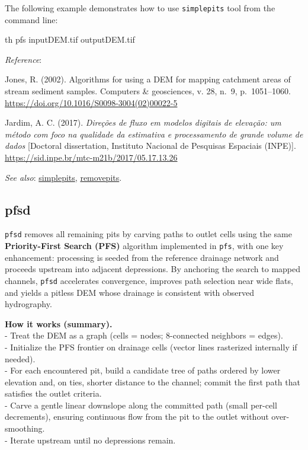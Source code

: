 \documentclass[
]{book}
\newenvironment{Shaded}{\begin{snugshade}}{\end{snugshade}}
\newcommand{\ExtensionTok}[1]{#1}
\newcommand{\NormalTok}[1]{#1}
\theoremstyle{definition}
\theoremstyle{definition}
\theoremstyle{definition}
\theoremstyle{definition}
\theoremstyle{remark}
\begin{document}
The following example demonstrates how to use \texttt{simplepits} tool from the command line:

\begin{Shaded}
\begin{Highlighting}[]
\ExtensionTok{th}\NormalTok{ pfs inputDEM.tif outputDEM.tif}
\end{Highlighting}
\end{Shaded}

\emph{Reference}:

Jones, R. (2002). Algorithms for using a DEM for mapping catchment areas of stream sediment samples. Computers \& geosciences, v. 28, n.~9, p.~1051--1060. \url{https://doi.org/10.1016/S0098-3004(02)00022-5}

Jardim, A. C. (2017). \emph{Direções de fluxo em modelos digitais de elevação: um método com foco na qualidade da estimativa e processamento de grande volume de dados} {[}Doctoral dissertation, Instituto Nacional de Pesquisas Espaciais (INPE){]}. \href{http://mtc-m21b.sid.inpe.br/col/sid.inpe.br/mtc-m21b/2017/05.17.13.26/doc/publicacao.pdf?metadatarepository=sid.inpe.br/mtc-m21b/2017/05.17.13.26.57&mirror=sid.inpe.br/mtc-m21b/2013/09.26.14.25.22&languagebutton=en}{https://sid.inpe.br/mtc-m21b/2017/05.17.13.26}

\emph{See also}: \hyperref[simplepits]{simplepits}, \hyperref[removepits]{removepits}.

\subsection{pfsd}\label{pfsd}

\texttt{pfsd} removes all remaining pits by carving paths to outlet cells using the same \textbf{Priority-First Search (PFS)} algorithm implemented in \texttt{pfs}, with one key enhancement: processing is seeded from the reference drainage network and proceeds upstream into adjacent depressions. By anchoring the search to mapped channels, \texttt{pfsd} accelerates convergence, improves path selection near wide flats, and yields a pitless DEM whose drainage is consistent with observed hydrography.

\textbf{How it works (summary).}\\
- Treat the DEM as a graph (cells = nodes; 8-connected neighbors = edges).\\
- Initialize the PFS frontier on drainage cells (vector lines rasterized internally if needed).\\
- For each encountered pit, build a candidate tree of paths ordered by lower elevation and, on ties, shorter distance to the channel; commit the first path that satisfies the outlet criteria.\\
- Carve a gentle linear downslope along the committed path (small per-cell decrements), ensuring continuous flow from the pit to the outlet without over-smoothing.\\
- Iterate upstream until no depressions remain.
\end{document}
